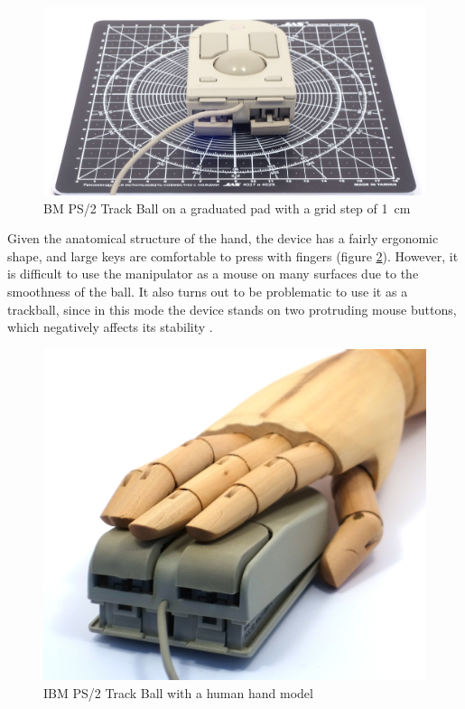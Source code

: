 \documentclass[11pt, a4paper]{article}
\begin{document}
\begin{figure}[h]
    \centering
    \includegraphics[scale=0.5]{1992_ibm_convertible/size_30.jpg}
    \caption{BM PS/2 Track Ball on a graduated pad with a grid step of 1~cm}
    \label{fig:IBMConvertibleSize}
\end{figure}

Given the anatomical structure of the hand, the device has a fairly ergonomic shape, and large keys are comfortable to press with fingers (figure \ref{fig:IBMConvertibleHand}). However, it is difficult to use the manipulator as a mouse on many surfaces due to the smoothness of the ball. It also turns out to be problematic to use it as a trackball, since in this mode the device stands on two protruding mouse buttons, which negatively affects its stability \cite{IBM}.

\begin{figure}[h]
    \centering
    \includegraphics[scale=0.45]{1992_ibm_convertible/hand_60.jpg}
    \caption{IBM PS/2 Track Ball with a human hand model}
    \label{fig:IBMConvertibleHand}
\end{figure}
\end{document}
